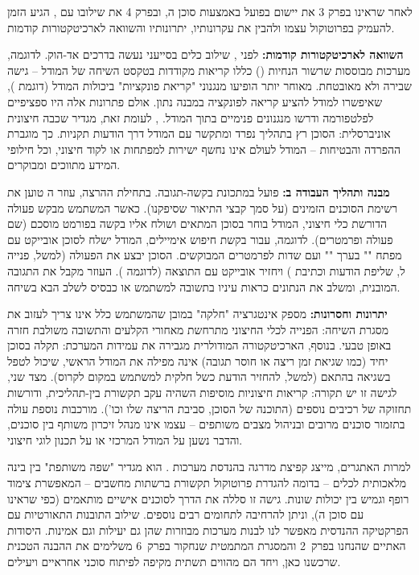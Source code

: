 
לאחר שראינו בפרק \num{3} את יישום  בפועל באמצעות סוכן ה, ובפרק \num{4} את שילובו עם , הגיע הזמן להעמיק בפרוטוקול עצמו ולהבין את עקרונותיו, יתרונותיו והשוואה לארכיטקטורות קודמות.

\textbf{השוואה לארכיטקטורות קודמות:} לפני , שילוב כלים בסייעני  נעשה בדרכים אד-הוק. לדוגמה, מערכות מבוססות שרשור הנחיות () כללו קריאות  מקודדות בטקסט השיחה של המודל – גישה שבירה ולא מאובטחת. מאוחר יותר הופיעו מנגנוני "קריאת פונקציות" ביכולות המודל (דוגמת ), שאיפשרו למודל להציע קריאה לפונקציה במבנה נתון. אולם פתרונות אלה היו ספציפיים לפלטפורמה ודרשו מנגנונים פנימיים בתוך המודל. , לעומת זאת, מגדיר שכבה חיצונית אוניברסלית: הסוכן רץ בתהליך נפרד ומתקשר עם המודל דרך הודעות  תקניות. כך מוגברת ההפרדה והבטיחות – המודל לעולם אינו נחשף ישירות למפתחות  או לקוד חיצוני, וכל חילופי המידע מתווכים ומבוקרים.

\textbf{מבנה ותהליך העבודה ב:}  פועל במתכונת בקשה-תגובה. בתחילת ההרצה, עוזר ה טוען את רשימת הסוכנים הזמינים (על סמך קבצי התיאור שסיפקנו). כאשר המשתמש מבקש פעולה הדורשת כלי חיצוני, המודל בוחר בסוכן המתאים ושולח אליו בקשה בפורמט  מוסכם (שם פעולה ופרמטרים). לדוגמה, עבור בקשת חיפוש אימיילים, המודל ישלח לסוכן  אובייקט עם מפתח "" בערך "" ועם שדות לפרמטרים המבוקשים. הסוכן יבצע את הפעולה (למשל, פנייה ל, שליפת הודעות וכתיבת ) ויחזיר אובייקט  עם התוצאה (לדוגמה ). העוזר מקבל את התגובה המובנית, ומשלב את הנתונים כראות עיניו בתשובה למשתמש או כבסיס לשלב הבא בשיחה.

\textbf{יתרונות וחסרונות:}  מספק אינטגרציה "חלקה" במובן שהמשתמש כלל אינו צריך לעזוב את מסגרת השיחה: הפנייה לכלי החיצוני מתרחשת מאחורי הקלעים והתשובה משולבת חזרה באופן טבעי. בנוסף, הארכיטקטורה המודולרית מגבירה את עמידות המערכת: תקלה בסוכן יחיד (כמו שגיאת זמן ריצה או חוסר תגובה) אינה מפילה את המודל הראשי, שיכול לטפל בשגיאה בהתאם (למשל, להחזיר הודעת כשל חלקית למשתמש במקום לקרוס). מצד שני, לגישה זו יש תקורה: קריאות חיצוניות מוסיפות השהיה עקב תקשורת בין-תהליכית, ודורשות תחזוקה של רכיבים נוספים (התוכנה של הסוכן, סביבת הריצה שלו וכו'). מורכבות נוספת עולה בתזמור סוכנים מרובים ובניהול מצבים משותפים –  עצמו אינו מנהל זיכרון משותף בין סוכנים, והדבר נשען על המודל המרכזי או על תכנון לוגי חיצוני.

למרות האתגרים,  מייצג קפיצת מדרגה בהנדסת מערכות . הוא מגדיר "שפה משותפת" בין בינה מלאכותית לכלים – בדומה להגדרת פרוטוקול תקשורת ברשתות מחשבים – המאפשרת צימוד רופף וגמיש בין יכולות שונות. גישה זו סללה את הדרך לסוכנים אישיים מותאמים (כפי שראינו עם סוכן ה), וניתן להרחיבה לתחומים רבים נוספים. שילוב התובנות התאורטיות עם הפרקטיקה ההנדסית מאפשר לנו לבנות מערכות  מבוזרות שהן גם יעילות וגם אמינות. היסודות האתיים שהנחנו בפרק~\num{2} והמסגרת המתמטית שנחקור בפרק~\num{6} משלימים את ההבנה הטכנית שרכשנו כאן, ויחד הם מהווים תשתית מקיפה לפיתוח סוכני  אחראיים ויעילים.
